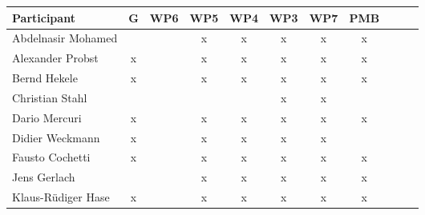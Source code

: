 \documentclass[a4paper, 11pt]{article}
\begin{document}
\begin{tabular}{|l|c|c|c|c||c|c|c||c|c|c|}
\hline
\textbf{Participant}  & \textbf{G} & \textbf{WP6} &  \textbf{WP5} & \textbf{WP4}&  \textbf{WP3} & \textbf{WP7}&  \textbf{PMB} \\\hline
Abdelnasir Mohamed    &  &   & x & x  & x &x  &x  \\\hline 
Alexander Probst      &  x &   & x  & x  & x & x &x  \\\hline  
Bernd Hekele          & x &   & x & x & x & x & x \\\hline
Christian Stahl      &   &   &  &  & x & x  &   \\\hline
Dario Mercuri        & x &   & x & x & x & x & x  \\\hline
Didier Weckmann      & x &   & x & x & x & x &  \\\hline
Fausto Cochetti      &  x &   &  x & x & x & x & x \\\hline
Jens Gerlach         &   &   &x  & x & x &  x & x  \\\hline
Klaus-R\"udiger Hase & x &   & x & x & x & x & x \\\hline

\end{tabular}
\end{document}
